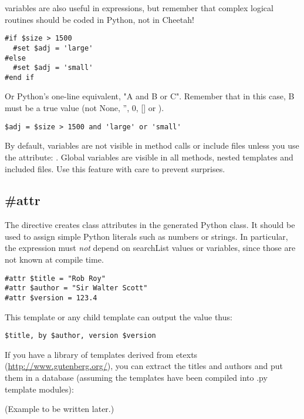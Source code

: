  variables are also useful in  expressions, but
remember that complex logical routines should be coded in Python, not in
Cheetah!
\begin{verbatim}
#if $size > 1500
  #set $adj = 'large'
#else
  #set $adj = 'small'
#end if
\end{verbatim}
Or Python's one-line equivalent, "A and B or C".  Remember that in this case,
B must be a true value (not None, '', 0, [] or {}).  
\begin{verbatim}
$adj = $size > 1500 and 'large' or 'small'
\end{verbatim}

By default,  variables are not visible in method calls or include
files unless you use the  attribute: .  Global variables are visible in all methods, nested templates and
included files.  Use this feature with care to prevent surprises.


\subsection{\#attr}
\label{inheritanceEtc.attr}

The  directive creates class attributes in the generated Python
class.  It should be used to assign simple Python literals such as numbers or
strings.  In particular, the expression must {\em not} depend on searchList
values or  variables, since those are not known at compile time.

\begin{verbatim}
#attr $title = "Rob Roy"
#attr $author = "Sir Walter Scott"
#attr $version = 123.4
\end{verbatim}

This template or any child template can output the value thus:
\begin{verbatim}
$title, by $author, version $version
\end{verbatim}

If you have a library of templates derived from etexts
(\url{http://www.gutenberg.org/}), you can extract the titles and authors
and put them in a database (assuming the templates have been compiled into
.py template modules):

(Example to be written later.)
%
%

